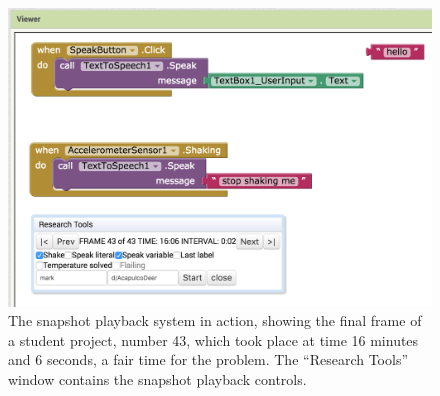 \begin{figure}
  \centering
      \includegraphics[width=\textwidth]{images/ch3-playback}
  \caption[Snapshot playback]{The snapshot playback system in action, showing the final frame of a student project, number 43, which took place at time 16 minutes and 6 seconds, a fair time for the problem. The ``Research Tools'' window contains the snapshot playback controls.}
  \label{img:playback}
\end{figure}










